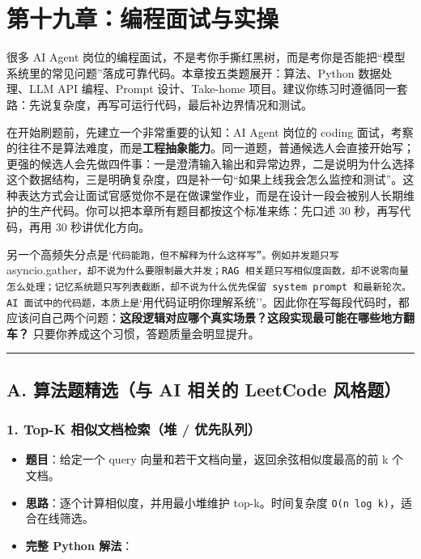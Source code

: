 \chapter{第十九章：编程面试与实操}

很多 AI Agent 岗位的编程面试，不是考你手撕红黑树，而是考你是否能把``模型系统里的常见问题''落成可靠代码。本章按五类题展开：算法、Python 数据处理、LLM API 编程、Prompt 设计、Take-home 项目。建议你练习时遵循同一套路：先说复杂度，再写可运行代码，最后补边界情况和测试。


在开始刷题前，先建立一个非常重要的认知：AI Agent 岗位的 coding 面试，考察的往往不是算法难度，而是\textbf{工程抽象能力}。同一道题，普通候选人会直接开始写；更强的候选人会先做四件事：一是澄清输入输出和异常边界，二是说明为什么选择这个数据结构，三是明确复杂度，四是补一句``如果上线我会怎么监控和测试''。这种表达方式会让面试官感觉你不是在做课堂作业，而是在设计一段会被别人长期维护的生产代码。你可以把本章所有题目都按这个标准来练：先口述 30 秒，再写代码，再用 30 秒讲优化方向。


另一个高频失分点是`\texttt{代码能跑，但不解释为什么这样写''。例如并发题只写 }asyncio.gather\texttt{，却不说为什么要限制最大并发；RAG 相关题只写相似度函数，却不说零向量怎么处理；记忆系统题只写列表截断，却不说为什么优先保留 system prompt 和最新轮次。AI 面试中的代码题，本质上是}`用代码证明你理解系统''。因此你在写每段代码时，都应该问自己两个问题：\textbf{这段逻辑对应哪个真实场景？这段实现最可能在哪些地方翻车？} 只要你养成这个习惯，答题质量会明显提升。


\bigskip\hrule\bigskip

\section{A. 算法题精选（与 AI 相关的 LeetCode 风格题）}

\subsection{1. Top-K 相似文档检索（堆 / 优先队列）}
\begin{itemize}[leftmargin=2em]
\item \textbf{题目}：给定一个 query 向量和若干文档向量，返回余弦相似度最高的前 k 个文档。
\item \textbf{思路}：逐个计算相似度，并用最小堆维护 top-k。时间复杂度 \texttt{O(n log k)}，适合在线筛选。
\item \textbf{完整 Python 解法}：
\end{itemize}

